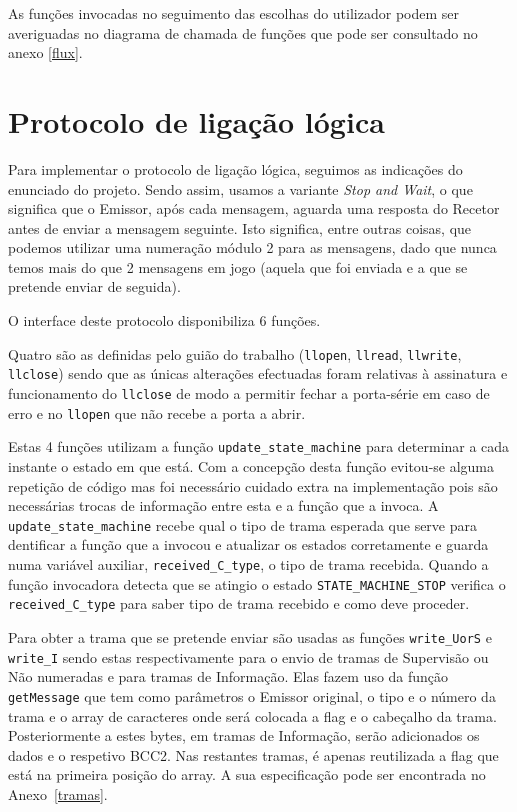 \documentclass[11pt,a4paper,reqno]{report}
\numberwithin{equation}{section}
\begin{document}
As funções invocadas no seguimento das escolhas do utilizador podem ser averiguadas no diagrama de chamada de funções que pode ser consultado no anexo \ref{flux}.

\chapter{Protocolo de ligação lógica}

Para implementar o protocolo de ligação lógica, seguimos as indicações do enunciado do projeto. Sendo assim, usamos a variante \emph{Stop and Wait}, o que significa que o Emissor, após cada mensagem, aguarda uma resposta do Recetor antes de enviar a mensagem seguinte. Isto significa, entre outras coisas, que podemos utilizar uma numeração módulo 2 para as mensagens, dado que nunca temos mais do que 2 mensagens em jogo (aquela que foi enviada e a que se pretende enviar de seguida).

O interface deste protocolo disponibiliza 6 funções. 

Quatro são as definidas pelo guião do trabalho (\verb|llopen|, \verb|llread|, \verb|llwrite|, \verb|llclose|) sendo que as únicas alterações efectuadas foram relativas à assinatura e funcionamento do \verb|llclose| de modo a permitir fechar a porta-série em caso de erro e no \verb|llopen|  que não recebe a porta a abrir. 

Estas 4 funções utilizam a função \verb|update_state_machine| para determinar a cada instante o estado em que está.
Com a concepção desta função evitou-se alguma repetição de código mas foi necessário cuidado extra na implementação pois são necessárias trocas de informação entre esta e a função que a invoca. A \verb|update_state_machine| recebe qual o tipo de trama esperada que serve para dentificar a função que a invocou e atualizar os estados corretamente e guarda numa variável auxiliar, \verb|received_C_type|, o tipo de trama recebida. Quando a função invocadora detecta que se atingio o estado \verb|STATE_MACHINE_STOP| verifica o \verb|received_C_type| para saber  tipo de trama recebido e como deve proceder.

Para obter a trama que se pretende enviar são usadas as funções \verb|write_UorS| e \verb|write_I| sendo estas respectivamente para o envio de tramas de Supervisão ou Não numeradas e para tramas de Informação. Elas fazem uso da função \verb|getMessage| que tem como parâmetros o Emissor original, o tipo e o número da trama e o array de caracteres onde será colocada a flag e o cabeçalho da trama. Posteriormente a estes bytes, em tramas de Informação, serão adicionados os dados e o respetivo BCC2. Nas restantes tramas, é apenas reutilizada a flag que está na primeira posição do array. A sua especificação pode ser encontrada no Anexo~\ref{tramas}.
\end{document}
